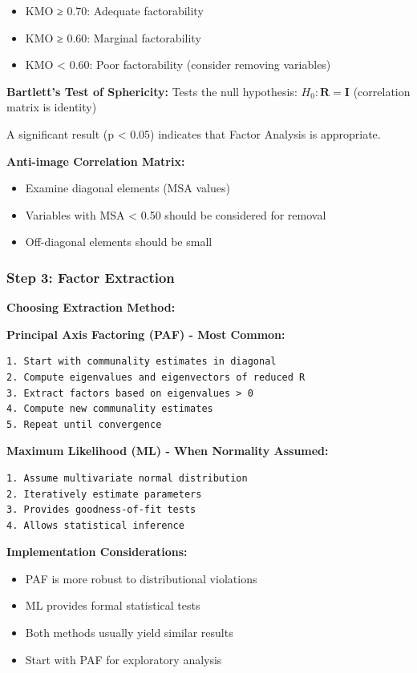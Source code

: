 \documentclass[
]{article}
\begin{document}
\begin{itemize}
\item
  KMO ≥ 0.70: Adequate factorability
\item
  KMO ≥ 0.60: Marginal factorability
\item
  KMO \textless{} 0.60: Poor factorability (consider removing variables)
\end{itemize}

\textbf{Bartlett's Test of Sphericity:} Tests the null hypothesis:
\(H_{0}:\mathbf{R} = \mathbf{I}\) (correlation matrix is identity)

A significant result (p \textless{} 0.05) indicates that Factor Analysis
is appropriate.

\textbf{Anti-image Correlation Matrix:}

\begin{itemize}
\item
  Examine diagonal elements (MSA values)
\item
  Variables with MSA \textless{} 0.50 should be considered for removal
\item
  Off-diagonal elements should be small
\end{itemize}

\subsubsection{Step 3: Factor Extraction}

\textbf{Choosing Extraction Method:}

\textbf{Principal Axis Factoring (PAF) - Most Common:}

\begin{verbatim}
1. Start with communality estimates in diagonal
2. Compute eigenvalues and eigenvectors of reduced R
3. Extract factors based on eigenvalues > 0
4. Compute new communality estimates
5. Repeat until convergence
\end{verbatim}

\textbf{Maximum Likelihood (ML) - When Normality Assumed:}

\begin{verbatim}
1. Assume multivariate normal distribution
2. Iteratively estimate parameters
3. Provides goodness-of-fit tests
4. Allows statistical inference
\end{verbatim}

\textbf{Implementation Considerations:}

\begin{itemize}
\item
  PAF is more robust to distributional violations
\item
  ML provides formal statistical tests
\item
  Both methods usually yield similar results
\item
  Start with PAF for exploratory analysis
\end{itemize}
\end{document}
